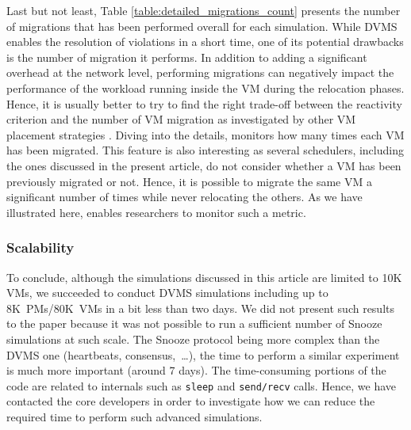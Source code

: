 Last but not least, Table \ref{table:detailed_migrations_count}
presents the number of migrations that has been performed overall for
each simulation. While DVMS enables the resolution of violations in a
short time, one of its potential drawbacks is the number of migration
it performs. In addition to adding a significant overhead at the
network level, performing migrations can negatively impact the
performance of the workload running inside the VM during the
relocation phases. Hence, it is usually better to try to find the
right trade-off between the reactivity criterion and the number of VM
migration as investigated by other VM placement strategies
\cite{eyraud:ipdps2013}. Diving into the details, \vmps monitors how
many times each VM has been migrated. This feature is also interesting as
several schedulers, including the ones discussed in the present
article, do not consider whether a VM has been previously migrated or
not.
Hence, it is possible to migrate the same VM a significant number
of times while never relocating the others. As we have illustrated
here, \vmps enables researchers to monitor such a metric.

\subsubsection{\vmps Scalability}
To conclude, although the simulations discussed in this article are
limited to 10K VMs, we succeeded to conduct DVMS simulations including
up to 8K~PMs/80K~VMs in a bit less than two days. We did not present
such results to the paper because it was not possible to run a
sufficient number of Snooze simulations at such scale. The Snooze
protocol being more complex than the DVMS one (heartbeats,
consensus,~\ldots), the time to perform a similar experiment is much
more important (around 7 days). The time-consuming portions of the
code are related to \sg internals such as \texttt{sleep} and
\texttt{send/recv} calls. Hence, we have contacted the \sg core
developers in order to investigate how we can reduce the required time
to perform such advanced simulations.



